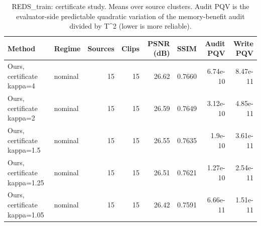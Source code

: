 \begin{table}[t]
\centering
\caption{REDS\_train: certificate study. Means over source clusters. Audit PQV is the evaluator-side predictable quadratic variation of the memory-benefit audit divided by T^2 (lower is more reliable).}
\label{tab:certificate_REDS_train}
\small
\begin{tabular}{llrrrrrr}
\toprule
Method & Regime & Sources & Clips & PSNR (dB) & SSIM & Audit PQV & Write PQV \\
\midrule
Ours, certificate kappa=4 & nominal & 15 & 15 & 26.62 & 0.7660 & 6.74e-10 & 8.47e-11 \\
Ours, certificate kappa=2 & nominal & 15 & 15 & 26.59 & 0.7649 & 3.12e-10 & 4.85e-11 \\
Ours, certificate kappa=1.5 & nominal & 15 & 15 & 26.55 & 0.7635 & 1.9e-10 & 3.61e-11 \\
Ours, certificate kappa=1.25 & nominal & 15 & 15 & 26.51 & 0.7621 & 1.27e-10 & 2.54e-11 \\
Ours, certificate kappa=1.05 & nominal & 15 & 15 & 26.42 & 0.7591 & 6.66e-11 & 1.51e-11 \\
\bottomrule
\end{tabular}
\end{table}
